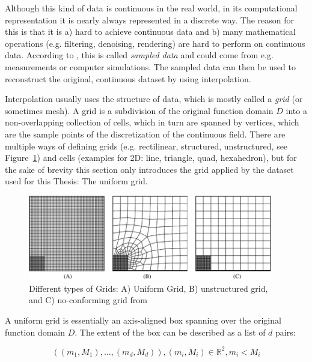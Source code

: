 Although this kind of data is continuous in the real world, in its computational representation it is nearly always represented in a discrete way. 
The reason for this is that it is a) hard to achieve continuous data and b) many mathematical operations (e.g. filtering, denoising, rendering) are hard to perform on continuous data. 
According to , this is called \textit{sampled data} and could come from e.g. measurements or computer simulations. 
The sampled data can then be used to reconstruct the original, continuous dataset by using interpolation. 

Interpolation usually uses the structure of data, which is mostly called a \textit{grid} (or sometimes mesh). 
A grid is a subdivision of the original function domain $D$ into a non\--overlapping collection of cells, which in turn are spanned by vertices, which are the sample points of the discretization of the continuous field.  
There are multiple ways of defining grids (e.g. rectilinear, structured, unstructured, see Figure~\ref{fig:grid types}) and cells (examples for 2D: line, triangle, quad, hexahedron), but for the sake of brevity this section only introduces the grid applied by the dataset used for this Thesis: The uniform grid. 

\begin{figure}
  \includegraphics[width=0.95\textwidth]{figures/grid-types.png}
  \caption{Different types of Grids: A) Uniform Grid, B) unstructured grid, and C) no-conforming grid from \cite{kaltenbacher_nonconforming_2022}}\label{fig:grid types}
\end{figure}


A uniform grid is essentially an axis-aligned box spanning over the original function domain $D$. 
The extent of the box can be described as a list of $d$ pairs:

\begin{equation}
  ((m_1, M_1),\dots,(m_d, M_d)), (m_i, M_i) \in \mathbb{R}^2, m_i < M_i
  \label{eq:uniform grid coordinates}
\end{equation}

